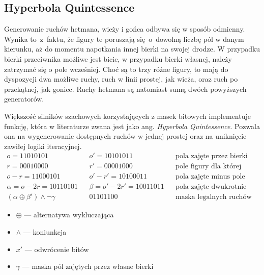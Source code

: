 \subsection{Hyperbola Quintessence}
\label{subsec:hyperbola-quintessence}

Generowanie ruchów hetmana, wieży i gońca odbywa się w sposób odmienny.
Wynika to~z~faktu, że figury te poruszają się~o~dowolną liczbę pól w danym kierunku, aż do momentu napotkania innej bierki na swojej drodze.
W przypadku bierki przeciwnika możliwe jest bicie, w przypadku bierki własnej, należy zatrzymać się o pole wcześniej.
Choć są to trzy różne figury, to mają do dyspozycji dwa możliwe ruchy, ruch w linii prostej, jak wieża, oraz ruch po przekątnej, jak goniec.
Ruchy hetmana są natomiast sumą dwóch powyższych generatorów.

Większość silników szachowych korzystających z masek bitowych implementuje funkcję, która w literaturze zwana jest jako ang. \emph{Hyperbola Quintessence}.
Pozwala ona na wygenerowanie dostępnych ruchów w jednej prostej oraz na uniknięcie zawiłej logiki iteracyjnej.
\begin{align*}
    o = \text{11010101} && o' = \text{10101011} && \text{pola zajęte przez bierki} \\
    r = \text{00010000} && r' = \text{00001000} && \text{pole figury dla której generujemy ruchy} \\
    o-r = \text{11000101} && o'-r' = \text{10100011} && \text{pola zajęte minus pole figury} \\
    \alpha = o-2r = \text{10110101} && \beta = o'-2r' = \text{10011011} && \text{pola zajęte dwukrotnie minus pole figury} \\
    (\alpha \oplus \beta') \wedge \neg \gamma && \text{01101100} && \text{maska legalnych ruchów}
\end{align*}
\begin{multicols}{2}
    \begin{itemize}[label={}]
        \item \(\oplus\) — alternatywa wykluczająca
        \item \(\wedge\) — koniunkcja
        \item \(x'\) — odwrócenie bitów
        \item \(\gamma\) — maska pól zajętych przez własne bierki
    \end{itemize}
\end{multicols}



